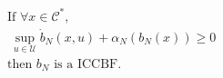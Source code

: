 \documentclass[preview]{standalone}
\begin{document}
\begin{align*}
&\text{If }\forall x \in \mathcal{C}^*,\\ &\ \sup_{u \in \mathcal{U}} \dot b_N(x, u) + \alpha_N(b_N(x)) \geq 0\\ &\text{then } b_N \text{ is a ICCBF.}
\end{align*}
\end{document}

